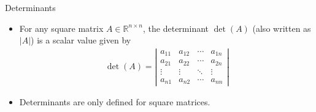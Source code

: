\begin{frame}{Determinants}
\begin{itemize}
    \item For any square matrix $A \in \mathbb{R}^{n\times n}$, the determinant $\det(A)$ (also written as $|A|$) is a scalar value given by
    \begin{align}
        \det (A) = \left\vert\begin{matrix}
            a_{11} & a_{12} & \cdots & a_{1n}\\
            a_{21} & a_{22} & \cdots & a_{2n} \\
            \vdots & \vdots & \ddots & \vdots \\
            a_{n1} & a_{n2} &\cdots & a_{nn}
        \end{matrix}\right\vert 
    \end{align}
    \item Determinants are only defined for square matrices.
\end{itemize}
\end{frame}


